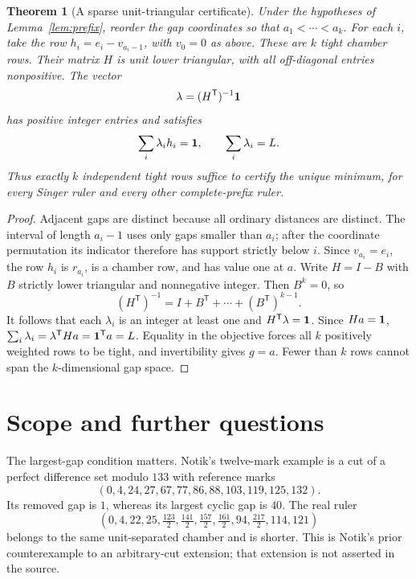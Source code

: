 \documentclass[11pt,a4paper]{article}
\newtheorem{theorem}{Theorem}
\begin{document}
\begin{theorem}[A sparse unit-triangular certificate]\label{thm:sparse}
Under the hypotheses of Lemma~\ref{lem:prefix}, reorder the gap
coordinates so that $a_1<\cdots<a_k$. For each $i$, take the row
$h_i=e_i-v_{a_i-1}$, with $v_0=0$ as above. These are $k$ tight
chamber rows. Their matrix $H$ is unit lower triangular, with all
off-diagonal entries nonpositive. The vector
\[
 \lambda=(H^{\mathsf T})^{-1}{\bf1}
\]
has positive integer entries and satisfies
\[
 \sum_i\lambda_i h_i={\bf1},\qquad \sum_i\lambda_i=L.
\]
Thus exactly $k$ independent tight rows suffice to certify the
unique minimum, for every Singer ruler and every other complete-prefix ruler.
\end{theorem}
\begin{proof}
Adjacent gaps are distinct because all ordinary distances are distinct.
The interval of length $a_i-1$ uses only gaps smaller than $a_i$;
after the coordinate permutation its indicator therefore has support
strictly below $i$. Since $v_{a_i}=e_i$, the row $h_i$ is
$r_{a_i}$, is a chamber row, and has value one at $a$.
Write $H=I-B$ with $B$ strictly lower triangular and nonnegative
integer. Then $B^k=0$, so
\[
 (H^{\mathsf T})^{-1}=I+B^{\mathsf T}+\cdots+(B^{\mathsf T})^{k-1}.
\]
It follows that each $\lambda_i$ is an integer at least one and
$H^{\mathsf T}\lambda={\bf1}$. Since $Ha={\bf1}$,
$\sum_i\lambda_i=\lambda^{\mathsf T}Ha={\bf1}^{\mathsf T}a=L$.
Equality in the objective forces all $k$ positively weighted rows
to be tight, and invertibility gives $g=a$. Fewer than $k$ rows
cannot span the $k$-dimensional gap space.
\end{proof}

\section{Scope and further questions}

The largest-gap condition matters. Notik's twelve-mark example
\cite[Proposition~2, pp.~5--6]{notik} is a cut of a perfect difference set
modulo $133$ with reference marks
\[
 (0,4,24,27,67,77,86,88,103,119,125,132).
\]
Its removed gap is $1$, whereas its largest cyclic gap is $40$.
The real ruler
\[
 (0,4,22,25,\tfrac{123}{2},\tfrac{141}{2},\tfrac{157}{2},
 \tfrac{161}{2},94,\tfrac{217}{2},114,121)
\]
belongs to the same unit-separated chamber and is shorter.
This is Notik's prior counterexample to an arbitrary-cut extension;
that extension is not asserted in the source.
\end{document}
